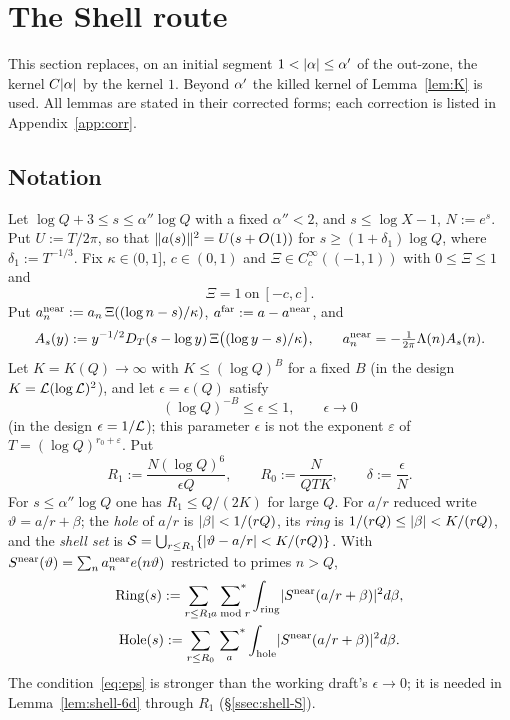 \section{The Shell route}\label{sec:shell}

This section replaces, on an initial segment $1<\lvert \alpha\rvert\le\alpha'$ of the out-zone, the kernel $C\lvert \alpha\rvert$ by the kernel $1$.
Beyond $\alpha'$ the killed kernel of Lemma~\ref{lem:K} is used. All lemmas are stated in their corrected forms; each correction is
listed in Appendix~\ref{app:corr}.

\subsection{Notation}\label{ssec:shell-notation}
Let $\log Q+3\le s\le\alpha''\log Q$ with a fixed $\alpha''<2$, and $s\le\log X-1$, $N:=e^s$. Put $U:=T/2\pi$, so that $\lVert a(s)\rVert^2=U(s+O(1))$ for
$s\ge(1+\delta_1)\log Q$, where $\delta_1:=T^{-1/3}$. Fix $\kappa\in(0,1]$, $c\in(0,1)$ and
$\Xi\in C_c^\infty((-1,1))$ with $0\le\Xi\le1$ and
\begin{equation}\label{eq:Xi}
\Xi=1\ \text{on}\ [-c,c].
\end{equation}
Put $a^{\rm near}_n:=a_n\,\Xi((\log n-s)/\kappa)$, $a^{\rm far}:=a-a^{\rm near}$, and
\[
A_s(y):=y^{-1/2}D_T(s-\log y)\,\Xi\bigl((\log y-s)/\kappa\bigr),\qquad a^{\rm near}_n=-\tfrac1{2\pi}\Lambda(n)A_s(n).
\]
Let $K=K(Q)\to\infty$ with $K\le(\log Q)^B$ for a fixed $B$ (in the design $K=\mathcal L(\log\mathcal L)^2$), and let $\epsilon=\epsilon(Q)$ satisfy
\begin{equation}\label{eq:eps}
(\log Q)^{-B}\le\epsilon\le1,\qquad \epsilon\to0
\end{equation}
(in the design $\epsilon=1/\mathcal L$); this parameter $\epsilon$ is not the exponent $\varepsilon$ of $T=(\log Q)^{r_0+\varepsilon}$. Put
\[
R_1:=\frac{N(\log Q)^6}{\epsilon Q},\qquad R_0:=\frac N{QTK},\qquad \delta:=\frac\epsilon N .
\]
For $s\le\alpha''\log Q$ one has $R_1\le Q/(2K)$ for large $Q$. For $a/r$ reduced write $\vartheta=a/r+\beta$; the \emph{hole} of $a/r$ is
$\lvert \beta\rvert<1/(rQ)$, its \emph{ring} is $1/(rQ)\le\lvert \beta\rvert<K/(rQ)$, and the \emph{shell set} is
$\mathcal S=\bigcup_{r\le R_1}\{\lvert \vartheta-a/r\rvert<K/(rQ)\}$. With $S^{\rm near}(\vartheta)=\sum_na^{\rm near}_ne(n\vartheta)$ restricted to primes $n>Q$,
\begin{gather*}
\mathrm{Ring}(s):=\sum_{r\le R_1}\sideset{}{^*}\sum_{a\bmod r}\int_{\rm ring}\lvert S^{\rm near}(a/r+\beta)\rvert^2d\beta,\\
\mathrm{Hole}(s):=\sum_{r\le R_0}\sideset{}{^*}\sum_{a}\int_{\rm hole}\lvert S^{\rm near}(a/r+\beta)\rvert^2d\beta .
\end{gather*}
The condition~\eqref{eq:eps} is stronger than the working draft's $\epsilon\to0$; it is needed in Lemma~\ref{lem:shell-6d} through $R_1$
(\S\ref{ssec:shell-S}).

